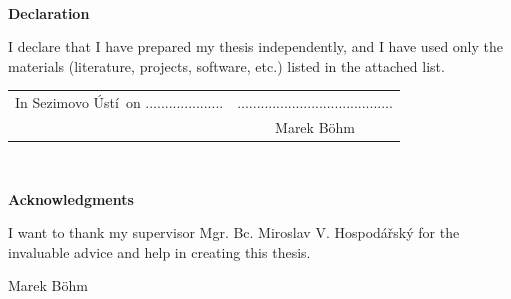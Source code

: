\documentclass[a4paper,twoside,12pt]{book}
\newcommand{\tb}{\textbf} %
\newcommand{\autor}{Marek Böhm}   %
\newcommand{\kde}{Sezimovo Ústí} %
\newcommand{\prohlaseni}{I declare that I have prepared my thesis independently, and I have used only the materials (literature, projects, software, etc.) listed in the attached list.} %
\newcommand{\podekovani}{I want to thank my supervisor Mgr. Bc. Miroslav V. Hospodářský for the invaluable advice and help in creating this thesis.} %
\begin{document}
\newpage %
\thispagestyle{empty}  %

~ %
\vfill %

\tb{Declaration} %

\vspace{1em} %
\prohlaseni

\vspace{2em}  %
\hspace{-0.5em}\begin{tabularx}{\textwidth}{X c}  %
In \kde\ on .................... &........................................ \\	%
	& \autor
\end{tabularx}	%


\newpage
\thispagestyle{empty}

~
\vfill %


\tb{Acknowledgments}

\vspace{1em} %
\podekovani
\begin{flushright}
\autor
\end{flushright}  %


\newpage   %
\thispagestyle{empty}   %

\newbox\odstavecbox
\newlength\vyskaodstavce
\newcommand\odstavec[2]{%
    \setbox\odstavecbox=\hbox{%
         \parbox[t]{#1}{#2\vrule width 0pt depth 4pt}}%
    \global\vyskaodstavce=\dp\odstavecbox
    \box\odstavecbox}
\newcommand{\delka}{120mm} %
\end{document}
